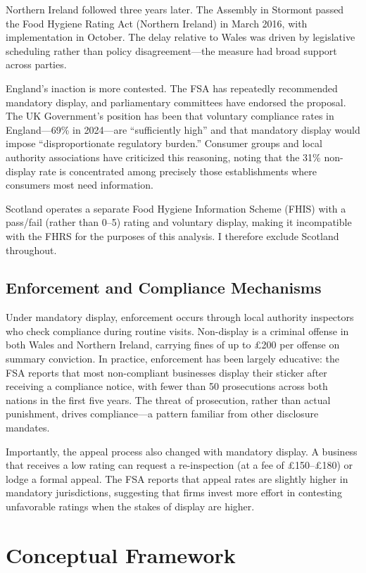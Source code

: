 \documentclass[12pt]{article}
\begin{document}
Northern Ireland followed three years later. The Assembly in Stormont passed the Food Hygiene Rating Act (Northern Ireland) in March 2016, with implementation in October. The delay relative to Wales was driven by legislative scheduling rather than policy disagreement---the measure had broad support across parties.

England's inaction is more contested. The FSA has repeatedly recommended mandatory display, and parliamentary committees have endorsed the proposal. The UK Government's position has been that voluntary compliance rates in England---69\% in 2024---are ``sufficiently high'' and that mandatory display would impose ``disproportionate regulatory burden.'' Consumer groups and local authority associations have criticized this reasoning, noting that the 31\% non-display rate is concentrated among precisely those establishments where consumers most need information.

Scotland operates a separate Food Hygiene Information Scheme (FHIS) with a pass/fail (rather than 0--5) rating and voluntary display, making it incompatible with the FHRS for the purposes of this analysis. I therefore exclude Scotland throughout.

\subsection{Enforcement and Compliance Mechanisms}

Under mandatory display, enforcement occurs through local authority inspectors who check compliance during routine visits. Non-display is a criminal offense in both Wales and Northern Ireland, carrying fines of up to £200 per offense on summary conviction. In practice, enforcement has been largely educative: the FSA reports that most non-compliant businesses display their sticker after receiving a compliance notice, with fewer than 50 prosecutions across both nations in the first five years. The threat of prosecution, rather than actual punishment, drives compliance---a pattern familiar from other disclosure mandates.

Importantly, the appeal process also changed with mandatory display. A business that receives a low rating can request a re-inspection (at a fee of £150--£180) or lodge a formal appeal. The FSA reports that appeal rates are slightly higher in mandatory jurisdictions, suggesting that firms invest more effort in contesting unfavorable ratings when the stakes of display are higher.


\section{Conceptual Framework}
\label{sec:framework}
\end{document}
